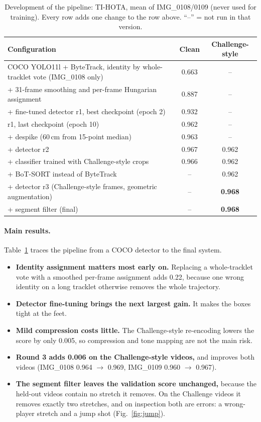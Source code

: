 \documentclass[11pt,a4paper]{article}
\begin{document}
\begin{table}[t]
\centering
\caption{Development of the pipeline: TI-HOTA, mean of IMG\_0108/0109 (never used for training). Every
row adds one change to the row above. ``--'' = not run in that version.}
\label{tab:main}
\small
\begin{tabular}{lcc}
\toprule
Configuration & Clean & Challenge-style \\
\midrule
COCO YOLO11l + ByteTrack, identity by whole-tracklet vote (IMG\_0108 only) & 0.663 & -- \\
\;+ 31-frame smoothing and per-frame Hungarian assignment & 0.887 & -- \\
\;+ fine-tuned detector r1, best checkpoint (epoch 2) & 0.932 & -- \\
\;\;\; r1, last checkpoint (epoch 10) & 0.962 & -- \\
\;+ despike (60\,cm from 15-point median) & 0.963 & -- \\
\;+ detector r2 & 0.967 & 0.962 \\
\;+ classifier trained with Challenge-style crops & 0.966 & 0.962 \\
\;+ BoT-SORT instead of ByteTrack & -- & 0.962 \\
\;+ detector r3 (Challenge-style frames, geometric augmentation) & -- & \textbf{0.968} \\
\;+ segment filter (final) & -- & \textbf{0.968} \\
\bottomrule
\end{tabular}
\end{table}

\paragraph{Main results.}
Table~\ref{tab:main} traces the pipeline from a COCO detector to the final system.
\begin{itemize}
\item \textbf{Identity assignment matters most early on.} Replacing a whole-tracklet vote with a
smoothed per-frame assignment adds 0.22, because one wrong identity on a long tracklet otherwise
removes the whole trajectory.
\item \textbf{Detector fine-tuning brings the next largest gain.} It makes the boxes tight at the feet.
\item \textbf{Mild compression costs little.} The Challenge-style re-encoding lowers the score by only
0.005, so compression and tone mapping are not the main risk.
\item \textbf{Round 3 adds 0.006 on the Challenge-style videos,} and improves both videos (IMG\_0108
0.964 $\rightarrow$ 0.969, IMG\_0109 0.960 $\rightarrow$ 0.967).
\item \textbf{The segment filter leaves the validation score unchanged,} because the held-out videos
contain no stretch it removes. On the Challenge videos it removes exactly two stretches, and on
inspection both are errors: a wrong-player stretch and a jump shot (Fig.~\ref{fig:jump}).
\end{itemize}
\end{document}
